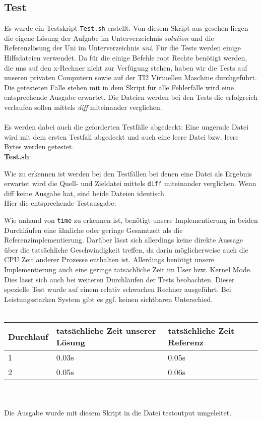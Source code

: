 \documentclass{ti2}
\begin{document}
\subsection*{Test}
Es wurde ein Testskript \texttt{Test.sh} erstellt. Von diesem Skript aus gesehen liegen die eigene Lösung der Aufgabe im Unterverzeichnis \textit{solution} und die Referenzlösung der Uni im Unterverzeichnis \textit{uni}. Für die Tests werden einige Hilfsdateien verwendet. Da für die einige Befehle root Rechte benötigt werden, die uns auf den x-Rechner nicht zur Verfügung stehen, haben wir die Tests auf unseren privaten Computern sowie auf der TI2 Virtuellen Maschine durchgeführt. Die getesteten Fälle stehen mit in dem Skript für alle Fehlerfälle wird eine entsprechende Ausgabe erwartet. Die Dateien werden bei den Tests die erfolgreich verlaufen sollen mittels \textit{diff} miteinander verglichen.\\ \\
Es werden dabei auch die geforderten Testfälle abgedeckt: Eine ungerade Datei wird mit dem ersten Testfall abgedeckt und auch eine leere Datei bzw. leere Bytes werden getestet.\\
\textbf{Test.sh}:

Wie zu erkennen ist werden bei den Testfällen bei denen eine Datei als Ergebnis erwartet wird die Quell- und Zieldatei mittels \texttt{diff} miteinander verglichen. Wenn diff keine Ausgabe hat, sind beide Dateien identisch.\\
Hier die entsprechende Testausgabe:

Wie anhand von \texttt{time} zu erkennen ist, benötigt unsere Implementierung in beiden Durchläufen eine ähnliche oder geringe Gesamtzeit als die Referenzimplementierung. Darüber lässt sich allerdings keine direkte Aussage über die tatsächliche Geschwindigkeit treffen, da darin möglicherweise auch die CPU Zeit anderer Prozesse enthalten ist. Allerdings benötigt unsere Implementierung auch eine geringe tatsächliche Zeit im User bzw. Kernel Mode. Dies lässt sich auch bei weiteren Durchläufen der Tests beobachten. Dieser spezielle Test wurde auf einem relativ schwachen Rechner ausgeführt. Bei Leistungsstarken System gibt es ggf. keinen sichtbaren Unterschied. \\ \\
\begin{tabular}{|l | l | l | }
	\hline
	Durchlauf &tatsächliche Zeit unserer Lösung & tatsächliche Zeit Referenz\\
	\hline
	1 & 0.03s & 0.05s  \\
	2& 0.05s & 0.06s  \\
	\hline
\end{tabular}
\\ \\ Die Ausgabe wurde mit diesem Skript in die Datei testoutput umgeleitet. 

\newpage
\end{document}
